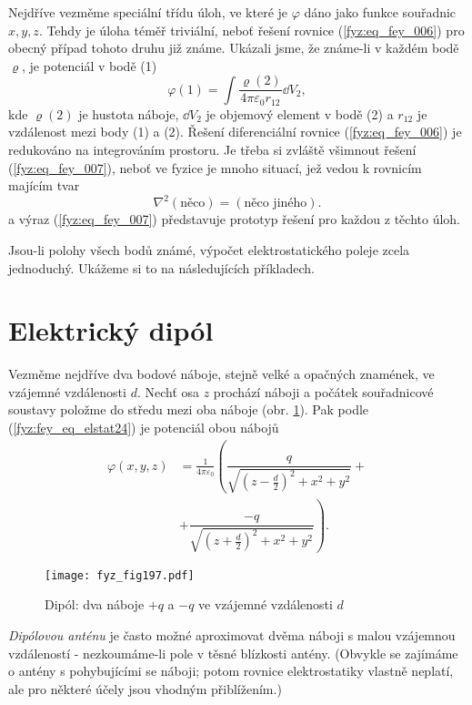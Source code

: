   Nejdříve vezměme speciální třídu úloh, ve které je \(\varphi\) dáno jako funkce souřadnic \(x, 
  y, z\). Tehdy je úloha téměř triviální, neboť řešení rovnice (\ref{fyz:eq_fey_006}) pro obecný 
  případ tohoto druhu již známe. Ukázali jsme, že známe-li v každém bodě \(\varrho\), je 
  potenciál v bodě (1)
  \begin{equation}\label{fyz:eq_fey_007}
  \varphi(1) = \int{\dfrac{\varrho(2)}{4\pi\varepsilon_0r_{12}}}\dd{V_2},
  \end{equation}
  kde \(\varrho(2)\) je hustota náboje, \(\dd{V_2}\) je objemový element v bodě (2) a \(r_{12}\) je
  vzdálenost mezi body (1) a (2). Řešení diferenciální rovnice (\ref{fyz:eq_fey_006}) je redukováno
  na integrováním prostoru. Je třeba si zvláště všimnout řešení (\ref{fyz:eq_fey_007}), neboť ve
  fyzice je mnoho situací, jež vedou k rovnicím majícím tvar
  \begin{equation}\label{fyz:eq_fey_008}
  \nabla^2(\text{něco}) = (\text{něco jiného}).
  \end{equation}
  a výraz (\ref{fyz:eq_fey_007}) představuje prototyp řešení pro každou z těchto úloh.
  
  Jsou-li polohy všech bodů známé, výpočet elektrostatického poleje zcela jednoduchý. Ukážeme si to
  na následujících příkladech.

\section{Elektrický dipól}\label{fyz:IIchapVsecXI}
  Vezměme nejdříve dva bodové náboje, stejně velké a opačných znamének, ve vzájemné vzdálenosti
  \(d\). Nechť osa \(z\) prochází náboji a počátek souřadnicové soustavy položme do středu mezi oba
  náboje (obr. \ref{fyz:fig197}). Pak podle (\ref{fyz:fey_eq_elstat24}) je potenciál obou nábojů
  \begin{align}
    \varphi(x,y,z) 
      &= \frac{1}{4\pi\varepsilon_0}
         \left(\dfrac{q}{\sqrt{(z -\frac{d}{2})^2+x^2+y^2}} + \right.    \nonumber \\         
      &+ \left.\dfrac{-q}{\sqrt{(z+\frac{d}{2})^2+x^2+y^2}}\right).      \label{fyz:eq_fey_009}
  \end{align}
  \begin{figure}[ht!] %
    \centering
    \texttt{[image: fyz\_fig197.pdf]}
    \caption{Dipól: dva náboje \(+q\) a \(-q\) ve vzájemné vzdálenosti \(d\)}
    \label{fyz:fig197}
  \end{figure}
  \emph{Dipólovou anténu} je často možné aproximovat dvěma náboji s malou vzájemnou vzdáleností -
  nezkoumáme-li pole v těsné blízkosti antény. (Obvykle se zajímáme o antény s pohybujícími se
  náboji; potom rovnice elektrostatiky vlastně neplatí, ale pro některé účely jsou vhodným
  přiblížením.)
  
